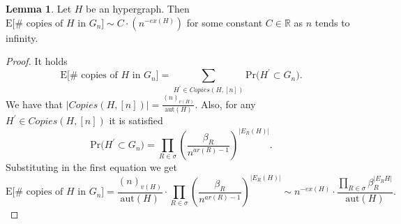 \documentclass[12pt,notitlepage,a4paper]{article}
\theoremstyle{definition}
\newtheorem{lemma}{Lemma}[section]
\newcommand{\R}{\mathbb{R}}
\newcommand{\PR}[1]{\mathrm{Pr}\big(#1\big)}
\newcommand{\aut}{\mathrm{aut}}
\begin{document}
\begin{lemma}
	Let $H$ be an hypergraph. Then 
	$\mathrm{E}\big[\# \text{ copies of }H \text{ in } G_n\big]\sim
	C\cdot(n^{-ex(H)})$ for some constant $C\in \R$ as $n$ tends to infinity.  
\end{lemma}
\begin{proof}
It holds
\[
 \mathrm{E}\big[\# \text{ copies of }H \text{ in } G_n\big]=
 \sum_{H^\prime \in Copies(H,[n])} \PR{H^\prime \subset G_n}.
\]	
We have that $|Copies(H,[n])|=\frac{(n)_{v(H)}}{\aut(H)}$. Also, 
for any $H^\prime \in Copies(H,[n])$ it is satisfied
\[
\PR{H^\prime \subset G_n}= \prod_{R\in \sigma} \left(\frac{\beta_R}{n^{ar(R)-1}} 
\right)^{|E_R(H)|}.
\]
Substituting in the first equation we get
\[
\mathrm{E}\big[\# \text{ copies of }H \text{ in } G_n\big]=
\frac{(n)_{v(H)}}{\aut(H)}\cdot
\prod_{R\in \sigma} \left(\frac{\beta_R}{n^{ar(R)-1}}\right)^{|E_R(H)|}
\sim
n^{-ex(H)} \cdot \frac{\prod_{R\in \sigma} \beta_R^{
|E_R{H}| }}{\aut(H)}.
\]	




\end{proof}
\end{document}

